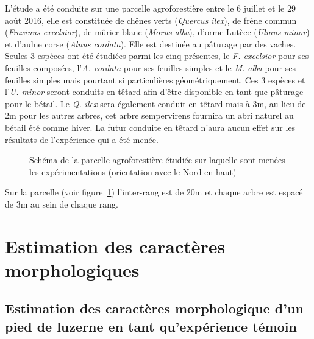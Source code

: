 ﻿\documentclass[12pt]{report}
\begin{document}
L'étude a été conduite sur une parcelle agroforestière entre le 6 juillet et le
29 août 2016, elle est constituée de chênes verts (\textit{Quercus ilex}), de frêne commun
(\textit{Fraxinus excelsior}), de mûrier blanc (\textit{Morus alba}),
d'orme Lutèce (\textit{Ulmus minor}) et d'aulne corse
(\textit{Alnus cordata}). Elle est destinée au pâturage par des vaches. Seules 3
espèces ont été étudiées parmi les cinq
présentes, le \textit{F. excelsior} pour ses feuilles composées,
l'\textit{A. cordata} pour ses feuilles simples et le \textit{M. alba} pour ses
feuilles simples mais pourtant si particulières géométriquement. Ces 3 espèces
et l'\textit{U. minor} seront conduits en têtard afin d'être disponible en			%
tant que pâturage pour le bétail. Le \textit{Q. ilex} sera également conduit			%
en têtard mais à 3m, au lieu de 2m pour les autres arbres, cet arbre sempervirens
fournira un abri naturel au bétail été comme hiver. La futur conduite en têtard
n'aura aucun effet sur les résultats de l'expérience qui a été menée.

\begin{figure}
  \centering
  \def\svgwidth{\linewidth}
  
  \caption{Schéma de la parcelle agroforestière étudiée sur laquelle sont
  menées les expérimentations (orientation avec le Nord en haut)\label{fig:parcelle}}
\end{figure}

Sur la parcelle (voir figure~\ref{fig:parcelle}) l'inter-rang est de 20m et chaque arbre est
espacé de 3m au sein de chaque rang.



\section{Estimation des caractères morphologiques}


\subsection{Estimation des caractères morphologique d'un pied de luzerne en tant qu'expérience témoin}
\end{document}
